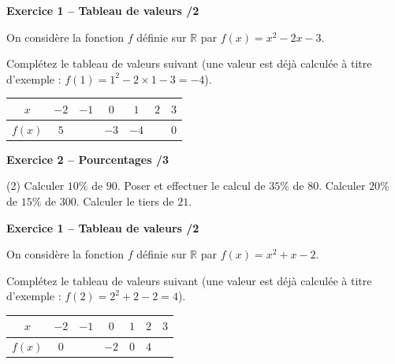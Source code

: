 \documentclass[10pt,a4paper]{article}
\begin{document}


\textbf{Exercice 1 -- Tableau de valeurs \hfill /2}

On considère la fonction \(f\) définie sur \(\mathbb{R}\) par \(f(x)=x^2-2x-3\).

Complétez le tableau de valeurs suivant (une valeur est déjà calculée à titre d'exemple : \(f(1)=1^2-2\times 1-3=-4\)).

\begin{center}
    \renewcommand{\arraystretch}{1.5}
    \setlength{\tabcolsep}{0.25cm}
    \begin{tabular}{|*{7}{c|}}
    \hline
    \(x\) & \(-2\) & \(-1\) & \(0\) & \(1\) & \(2\) & \(3\) \\
    \hline
    \(f(x)\) & \(5\) & & \(-3\) & \(-4\) & & \(0\) \\
    \hline
    \end{tabular}
\end{center}

\vspace{3cm}

\textbf{Exercice 2 -- Pourcentages \hfill /3}

\begin{tasks}(2)
    \task Calculer \(10\%\) de \(90\).
    \task Poser et effectuer le calcul de \(35\%\) de \(80\).
    \task Calculer \(20\%\) de \(15\%\) de \(300\).
    \task Calculer le tiers de \(21\).
\end{tasks}

\newpage



\textbf{Exercice 1 -- Tableau de valeurs \hfill /2}

On considère la fonction \(f\) définie sur \(\mathbb{R}\) par \(f(x)=x^2+x-2\).

Complétez le tableau de valeurs suivant (une valeur est déjà calculée à titre d'exemple : \(f(2)=2^2+2-2=4\)).

\begin{center}
    \renewcommand{\arraystretch}{1.5}
    \setlength{\tabcolsep}{0.25cm}
    \begin{tabular}{|*{7}{c|}}
    \hline
    \(x\) & \(-2\) & \(-1\) & \(0\) & \(1\) & \(2\) & \(3\) \\
    \hline
    \(f(x)\) & \(0\) & & \(-2\) & \(0\) & \(4\) &  \\
    \hline
    \end{tabular}
\end{center}
\end{document}
